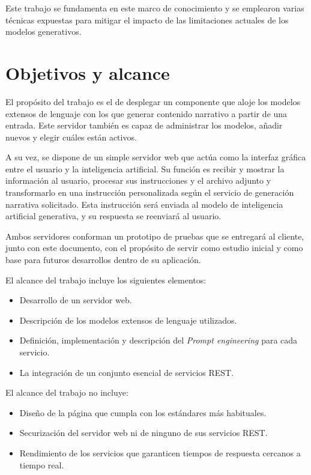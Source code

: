 Este trabajo se fundamenta en este marco de conocimiento
y se emplearon varias técnicas expuestas para mitigar el impacto de las
limitaciones actuales de los modelos generativos.


\section{Objetivos y alcance}
El propósito del trabajo es el de desplegar un componente que aloje los modelos extensos de lenguaje
con los que generar contenido narrativo a partir de una entrada.
Este servidor también es capaz de administrar los modelos, añadir nuevos y elegir cuáles están activos.

A su vez, se dispone de un simple servidor web que actúa como la interfaz gráfica entre el usuario y
la inteligencia artificial. Su función es recibir y mostrar la información al usuario,
procesar sus instrucciones y el archivo adjunto
y transformarlo en una instrucción personalizada según el servicio de generación narrativa solicitado.
Esta instrucción será enviada al modelo de inteligencia artificial generativa, y su respuesta se reenviará al usuario.

Ambos servidores conforman un prototipo de pruebas que se entregará al cliente,
junto con este documento, con el propósito de servir como estudio inicial y
como base para futuros desarrollos dentro de su aplicación.

El alcance del trabajo incluye los siguientes elementos:
\begin{itemize}
	\item Desarrollo de un servidor web.
	\item Descripción de los modelos extensos de lenguaje utilizados.
	\item Definición, implementación y descripción del \textit{Prompt engineering} para cada servicio.
	\item La integración de un conjunto esencial de servicios REST.
\end{itemize}

El alcance del trabajo no incluye:
\begin{itemize}
	\item Diseño de la página que cumpla con los estándares más habituales.
	\item Securización del servidor web ni de ninguno de sus servicios REST.
	\item Rendimiento de los servicios que garanticen tiempos de respuesta cercanos a tiempo real.
\end{itemize}
